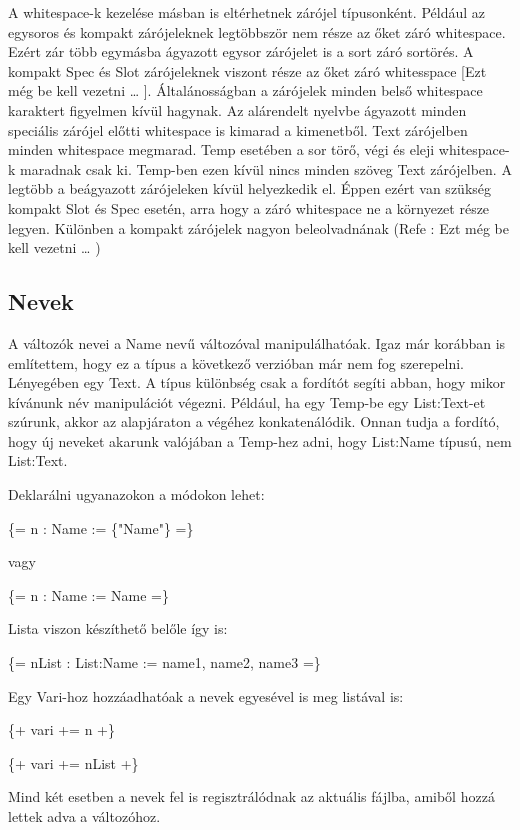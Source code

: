 A whitespace-k kezelése másban is eltérhetnek zárójel típusonként. 
Például az egysoros és kompakt zárójeleknek legtöbbször nem része az őket záró whitespace. 
Ezért zár több egymásba ágyazott egysor zárójelet is a sort záró sortörés. 
A kompakt Spec és Slot zárójeleknek viszont része az őket záró whitesspace [Ezt még be kell vezetni … ]. 
Általánosságban a zárójelek minden belső whitespace karaktert figyelmen kívül hagynak. 
Az alárendelt nyelvbe ágyazott minden speciális zárójel előtti whitespace is kimarad a kimenetből. 
Text zárójelben minden whitespace megmarad. 
Temp esetében a sor törő, végi és eleji whitespace-k maradnak csak ki. 
Temp-ben ezen kívül nincs minden szöveg Text zárójelben. 
A legtöbb a beágyazott zárójeleken kívül helyezkedik el. 
Éppen ezért van szükség kompakt Slot és Spec esetén, arra hogy a záró whitespace ne a környezet része legyen. 
Különben a kompakt zárójelek nagyon beleolvadnának (Refe : Ezt még be kell vezetni … )



\subsection{Nevek}
A változók nevei a Name nevű változóval manipulálhatóak.
Igaz már korábban is említettem, hogy ez a típus a következő verzióban már nem fog szerepelni.
Lényegében egy Text.
A típus különbség csak a fordítót segíti abban, hogy mikor kívánunk név manipulációt végezni.
Például, ha egy Temp-be egy List:Text-et szúrunk, akkor az alapjáraton a végéhez konkatenálódik.
Onnan tudja a fordító, hogy új neveket akarunk valójában a Temp-hez adni, hogy List:Name típusú, nem List:Text.

Deklarálni ugyanazokon a módokon lehet:

\{= n : Name := \{"Name"\} =\}

vagy

\{= n : Name := Name =\}

Lista viszon készíthető belőle így is:

\{= nList : List:Name := name1, name2, name3 =\}

Egy Vari-hoz hozzáadhatóak a nevek egyesével is meg listával is:

\{+ vari += n +\}

\{+ vari += nList +\}

Mind két esetben a nevek fel is regisztrálódnak az aktuális fájlba, amiből hozzá lettek adva a változóhoz.



